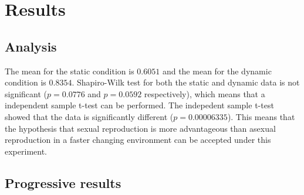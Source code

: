 \section{Results}

\subsection{Analysis}
The mean for the static condition is $0.6051$ and the mean for the dynamic condition is $0.8354$.
Shapiro-Wilk test for both the static and dynamic data is not significant ($p = 0.0776$ and $p = 0.0592$ respectively), which means that a independent sample t-test can be performed. %
The indepedent sample t-test showed that the data is significantly different ($p = 0.00006335$).
This means that the hypothesis that sexual reproduction is more advantageous than asexual reproduction in a faster changing environment can be accepted under this experiment.

\subsection{Progressive results}